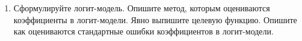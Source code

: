 \documentclass[12pt,a4paper]{article}
\begin{document}
\begin{enumerate}
\item Сформулируйте логит-модель. Опишите метод, которым оцениваются коэффициенты в логит-модели. Явно выпишите целевую функцию. Опишите как оцениваются стандартные ошибки коэффициентов в логит-модели.


\end{enumerate}
\end{document}
